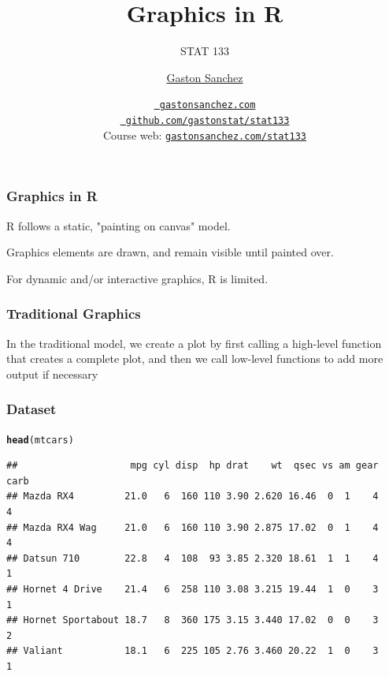 \documentclass[12pt]{beamer}\usepackage[]{graphicx}\usepackage[]{color}
\title{Graphics in R}
\subtitle{STAT 133}
\author{\href{http://www.gastonsanchez.com}{Gaston Sanchez}}
\institute{Department of Statistics, UC{\textendash}Berkeley}
\date{\href{http://www.gastonsanchez.com}{\tt \scriptsize \color{foreground} gastonsanchez.com}
\\[-4pt]
\href{http://github.com/gastonstat/stat133}{\tt \scriptsize \color{foreground} github.com/gastonstat/stat133}
\\[-4pt]
{\scriptsize Course web: \href{http://www.gastonsanchez.com/stat133}{\tt gastonsanchez.com/stat133}}
}
\makeatletter
\newcommand{\hlstd}[1]{\textcolor[rgb]{0.345,0.345,0.345}{#1}}%
\newcommand{\hlkwd}[1]{\textcolor[rgb]{0.737,0.353,0.396}{\textbf{#1}}}%
\newenvironment{kframe}{%
 \def\at@end@of@kframe{}%
 \ifinner\ifhmode%
  \def\at@end@of@kframe{\end{minipage}}%
  \begin{minipage}{\columnwidth}%
 \fi\fi%
 \def\FrameCommand##1{\hskip\@totalleftmargin \hskip-\fboxsep
 \colorbox{shadecolor}{##1}\hskip-\fboxsep
     \hskip-\linewidth \hskip-\@totalleftmargin \hskip\columnwidth}%
 \MakeFramed {\advance\hsize-\width
   \@totalleftmargin\z@ \linewidth\hsize
   \@setminipage}}%
 {\par\unskip\endMakeFramed%
 \at@end@of@kframe}
\newenvironment{knitrout}{}{} %
\makeatother
\begin{document}
{
  \frame{
    \titlepage
  } 
}


\begin{frame}
\begin{center}
\Huge{}
\end{center}
\end{frame}


\begin{frame}
\frametitle{Graphics in R}

\bi
  \item R  follows a static, "painting on canvas" model.
  \item Graphics elements are drawn, and remain visible until painted over.
  \item For dynamic and/or interactive graphics, R is limited.
\ei
\eb

\end{frame}


\begin{frame}
\frametitle{Traditional Graphics}

In the traditional model, we create a plot by first calling a high-level function that creates a complete plot, and then we call low-level functions to add more output if necessary
\eb

\end{frame}


\begin{frame}[fragile]
\frametitle{Dataset }
\begin{knitrout}\scriptsize
{}\color{fgcolor}\begin{kframe}
\begin{alltt}
\hlkwd{head}\hlstd{(mtcars)}
\end{alltt}
\begin{verbatim}
##                    mpg cyl disp  hp drat    wt  qsec vs am gear carb
## Mazda RX4         21.0   6  160 110 3.90 2.620 16.46  0  1    4    4
## Mazda RX4 Wag     21.0   6  160 110 3.90 2.875 17.02  0  1    4    4
## Datsun 710        22.8   4  108  93 3.85 2.320 18.61  1  1    4    1
## Hornet 4 Drive    21.4   6  258 110 3.08 3.215 19.44  1  0    3    1
## Hornet Sportabout 18.7   8  360 175 3.15 3.440 17.02  0  0    3    2
## Valiant           18.1   6  225 105 2.76 3.460 20.22  1  0    3    1
\end{verbatim}
\end{kframe}
\end{knitrout}
\end{frame}
\end{document}
